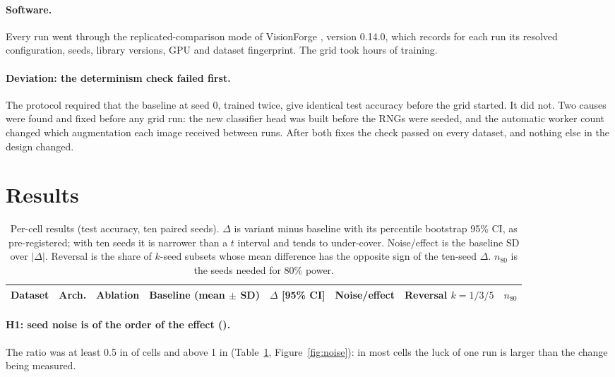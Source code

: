 \documentclass[10pt]{article}
\begin{document}
\paragraph{Software.} Every run went through the replicated-comparison mode of
VisionForge \citep{reis2026visionforge}, version 0.14.0, which records for each
run its resolved configuration, seeds, library versions, GPU and dataset
fingerprint. The grid took \WallHours{} hours of training.

\paragraph{Deviation: the determinism check failed first.} The protocol
required that the baseline at seed 0, trained twice, give identical test
accuracy before the grid started. It did not. Two causes were found and fixed
before any grid run: the new classifier head was built before the RNGs were
seeded, and the automatic worker count changed which augmentation each image
received between runs. After both fixes the check passed on every dataset, and
nothing else in the design changed.

\section{Results}\label{sec:results}

\begin{table}[t]
\centering
\caption{Per-cell results (test accuracy, ten paired seeds). $\Delta$ is
variant minus baseline with its percentile bootstrap 95\% CI, as pre-registered;
with ten seeds it is narrower than a $t$ interval and tends to under-cover.
Noise/effect is the baseline
SD over $|\Delta|$. Reversal is the share of $k$-seed subsets whose mean
difference has the opposite sign of the ten-seed $\Delta$. $n_{80}$ is the seeds
needed for 80\% power.}
\label{tab:cells}
\small
\begin{tabular}{lllcccc r}
\toprule
Dataset & Arch. & Ablation & Baseline (mean $\pm$ SD) & $\Delta$ [95\% CI] &
Noise/effect & Reversal $k=1/3/5$ & $n_{80}$ \\
\midrule

\bottomrule
\end{tabular}
\end{table}

\paragraph{H1: seed noise is of the order of the effect (\HOne{}).} The ratio
was at least 0.5 in \NNoiseHalf{} of \NCells{} cells and above 1 in \NNoiseOne{}
(Table~\ref{tab:cells}, Figure~\ref{fig:noise}): in most cells the luck of one
run is larger than the change being measured.
\end{document}
